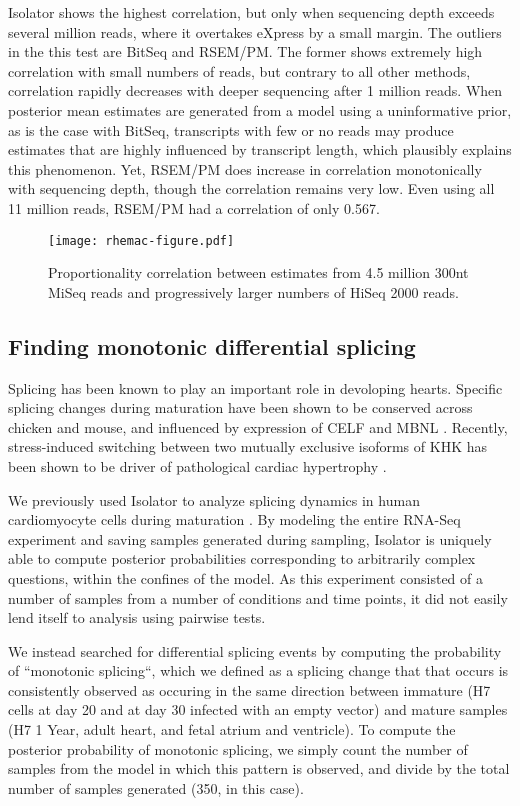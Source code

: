 \documentclass[twocolumn]{article}
\begin{document}
Isolator shows the highest correlation, but only when sequencing depth
exceeds several million reads, where it overtakes eXpress by a small
margin. The outliers in the this test are BitSeq and RSEM/PM. The former
shows extremely high correlation with small numbers of reads, but
contrary to all other methods, correlation rapidly decreases with deeper
sequencing after 1 million reads. When posterior mean estimates are
generated from a model using a uninformative prior, as is the case with
BitSeq, transcripts with few or no reads may produce estimates that are
highly influenced by transcript length, which plausibly explains this
phenomenon. Yet, RSEM/PM does increase in correlation monotonically with
sequencing depth, though the correlation remains very low. Even using
all 11 million reads, RSEM/PM had a correlation of only 0.567.

\begin{figure}
\texttt{[image: rhemac-figure.pdf]}
\caption{Proportionality correlation between estimates from 4.5 million 300nt
MiSeq reads and progressively larger numbers of HiSeq 2000 reads.}
\label{fig:rhemac}
\end{figure}

\subsection{Finding monotonic differential splicing}\label{finding-monotonic-differential-splicing}

Splicing has been known to play an important role in devoloping hearts. Specific
splicing changes during maturation have been shown to be conserved across
chicken and mouse, and influenced by expression of CELF and MBNL
\cite{Kalsotra:2008ke}. Recently, stress-induced switching between two mutually
exclusive isoforms of KHK has been shown to be driver of pathological cardiac
hypertrophy \cite{Mirtschink:2015iq}.

We previously used Isolator to analyze splicing dynamics in human cardiomyocyte
cells during maturation \cite{Kuppusamy:2015ey}. By modeling the entire RNA-Seq
experiment and saving samples generated during sampling, Isolator is uniquely
able to compute posterior probabilities corresponding to arbitrarily complex
questions, within the confines of the model. As this experiment consisted of
a number of samples from a number of conditions and time points, it did not
easily lend itself to analysis using pairwise tests.

We instead searched for differential splicing events by computing the
probability of ``monotonic splicing``, which we defined as a splicing change
that that occurs is consistently observed as occuring in the same direction
between immature (H7 cells at day 20 and at day 30 infected with an empty
vector) and mature samples (H7 1 Year, adult heart, and fetal atrium and
ventricle). To compute the posterior probability of monotonic splicing, we
simply count the number of samples from the model in which this pattern is
observed, and divide by the total number of samples generated (350, in this
case).
\end{document}
